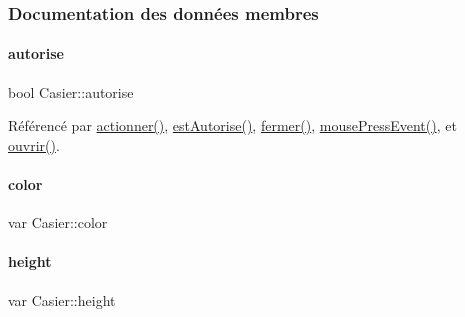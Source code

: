 \subsubsection{Documentation des données membres}
\mbox{\label{class_casier_a2dd9fbe4a93685080a9b5c8f69e3f29a}} 
\paragraph{\texorpdfstring{autorise}{autorise}}
{\footnotesize\ttfamily bool Casier\+::autorise\hspace{0.3cm}{\ttfamily [private]}}



Référencé par \hyperlink{class_casier_a9182fdde9d86e8f67e4d96ca3dad5eaa}{actionner()}, \hyperlink{class_casier_adc6f3502e2bc9bdafed9634f649b285c}{est\+Autorise()}, \hyperlink{class_casier_a4a6051d72548b83d4b2dfaf189ae6c72}{fermer()}, \hyperlink{class_casier_ad12cf89b6a99254f529997003adcf029}{mouse\+Press\+Event()}, et \hyperlink{class_casier_ac4b0de3ba58dc2bab52b049b278f4f90}{ouvrir()}.

\mbox{\label{class_casier_a487466f23493744123ce4a17dfe98916}} 
\paragraph{\texorpdfstring{color}{color}}
{\footnotesize\ttfamily var Casier\+::color\hspace{0.3cm}{\ttfamily [private]}}

\mbox{\label{class_casier_aac5102ef3b0edc40ebcffb9ef3805d63}} 
\paragraph{\texorpdfstring{height}{height}}
{\footnotesize\ttfamily var Casier\+::height\hspace{0.3cm}{\ttfamily [private]}}

\mbox{\label{class_casier_a17aa23e73b177559266a9fb17f63b812}} 
